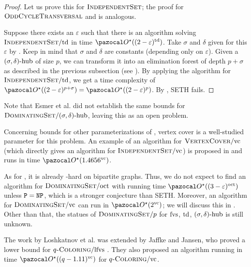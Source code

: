\begin{proof}
    Let us prove this for $\textsc{IndependentSet}$; the proof for $\textsc{OddCycleTransversal}$ and  is analogous.

    Suppose there exists an $\varepsilon$ such that there is an algorithm solving $\textsc{IndependentSet}/\text{td}$ in time $\O^\star((2 - \varepsilon)^\td)$. Take $\sigma$ and $\delta$ given for this $\varepsilon$ by . Keep in mind that $\sigma$ and $\delta$ are constants (depending only on $\varepsilon$). Given a $(\sigma, \delta)\text{-hub}$ of size $p$, we can transform it into an elimination forest of depth $p + \sigma$ as described in the previous subsection (see ). By applying the algorithm for $\textsc{IndependentSet}/\text{td}$, we get a time complexity of $\O^\star((2 - \varepsilon)^{p + \sigma}) = \O^\star((2 - \varepsilon)^p)$. By , SETH fails.
\end{proof}

Note that Esmer et al. did not establish the same bounds for $\textsc{DominatingSet}/(\sigma, \delta)\text{-hub}$, leaving this as an open problem.

\medskip

Concerning bounds for other parameterizations of , vertex cover is a well-studied parameter for this problem. An example of an algorithm for $\textsc{VertexCover}/\text{vc}$ (which directly gives an algorithm for $\textsc{IndependentSet}/\text{vc}$) is proposed in \cite[Theorem 3.2]{cygan2015parameterized} and runs in time $\O^\star(1.4656^\vc)$.

\medskip

As for , it is already \NP-hard on bipartite graphs. Thus, we do not expect to find an algorithm for $\textsc{DominatingSet}/\text{oct}$  with running time $\O^\star((3-\varepsilon)^\oct)$ unless $\texttt{P} = \texttt{NP}$, which is a stronger conjecture than SETH. Moreover, an algorithm for $\textsc{DominatingSet}/\text{vc}$ can run in $\O^\star(2^\vc)$; we will discuss this in . Other than that, the statues of $\textsc{DominatingSet}/p$ for $\text{fvs}$, $\text{td}$, $(\sigma, \delta)\text{-hub}$ is still unknown.

\medskip

The work by Loshkatnov et al. \cite{lokshtanov2011known} was extended by Jaffke and Jansen, who proved a lower bound for $q\textsc{-Coloring}/\text{lfvs}$ \cite{jaffke2017fine}. They also proposed an algorithm running in time $\O^\star((q - 1.11)^\vc)$ for $q\textsc{-Coloring}/\text{vc}$.

